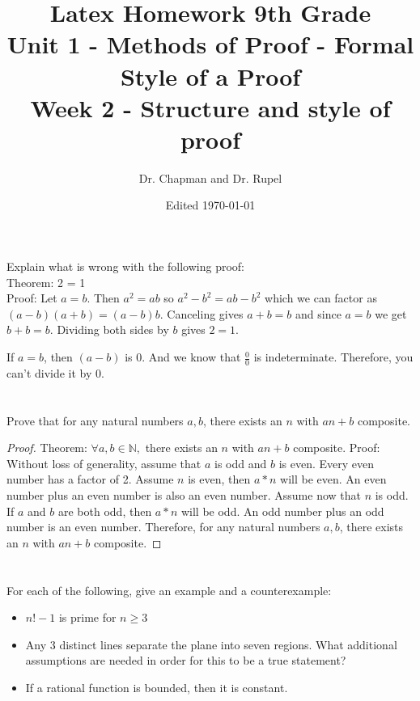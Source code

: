 \documentclass{amsart}
\title{Latex Homework 9th Grade\\ Unit 1 - Methods of Proof - Formal Style of a Proof\\ Week 2 - Structure and style of proof}
\author{Dr. Chapman and Dr. Rupel}
\date{Edited \today}
\begin{document}
\maketitle

\section{}
    Explain what is wrong with the following proof:\\ Theorem: 2 = 1\\Proof: Let \(a = b\). Then \(a^2 = ab\) so \(a^2-b^2 = ab - b^2\) which we can factor as \((a-b)(a+b) = (a-b)b\). Canceling gives \(a+b = b\) and since \(a = b\) we get \(b+b = b\). Dividing both sides by \(b\) gives \(2 = 1\).

	If \( a = b\), then \((a-b)\) is 0. And we know that $\frac{0}{0}$ is indeterminate. Therefore, you can't divide it by 0.
\section{}
    Prove that for any natural numbers \(a,b\), there exists an \(n\) with \(an+b\) composite.
	\begin{proof}
	Theorem: $\forall a,b\in\mathbb{N},$ there exists an $n$ with $an+b$ composite.
	Proof: Without loss of generality, assume that $a$ is odd and $b$ is even. Every even number has a factor of 2. Assume \(n\) is even, then $a*n$ will be even. An even number plus an
	even number is also an even number. Assume now that $n$ is odd. If $a$ and $b$ are both odd, then $a*n$ will be odd. An odd number plus an odd number is an even number. Therefore, for any natural numbers $a,b$, there exists an $n$ with $an+b$ composite.
	\end{proof}
    
\section{}
    For each of the following, give an example and a counterexample:
    \begin{itemize}
        \item \(n!-1\) is prime for \(n \geq 3\)
        \item Any 3 distinct lines separate the plane into seven regions.  What additional assumptions are needed in order for this to be a true statement?
        \item If a rational function is bounded, then it is constant.
    \end{itemize}
    
\end{document}
